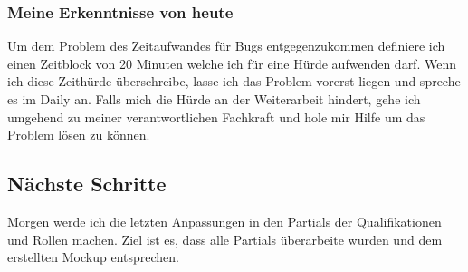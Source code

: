 \subsubsection*{Meine Erkenntnisse von heute}
Um dem Problem des Zeitaufwandes für Bugs entgegenzukommen definiere ich einen Zeitblock von 20 Minuten welche ich für eine Hürde aufwenden darf. 
Wenn ich diese Zeithürde überschreibe, lasse ich das Problem vorerst liegen und spreche es im Daily an. Falls mich die Hürde an der Weiterarbeit hindert, 
gehe ich umgehend zu meiner verantwortlichen Fachkraft und hole mir Hilfe um das Problem lösen zu können.

\subsection*{Nächste Schritte}
Morgen werde ich die letzten Anpassungen in den Partials der Qualifikationen und Rollen machen. Ziel ist es, dass
alle Partials überarbeite wurden und dem erstellten Mockup entsprechen.

\pagebreak
